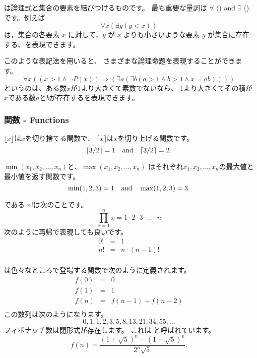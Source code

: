 
は論理式と集合の要素を結びつけるものです。
最も重要な量詞は
$\forall$ () and $\exists$ ().
です。例えば
\[\forall x (\exists y (y < x))\]
は，集合の各要素 $x$ に対して，$y$ が $x$ よりも小さいような要素 $y$ が集合に存在する、を表現できます。

このような表記法を用いると、
さまざまな論理命題を表現することができます。
\[\forall x ((x>1 \land \lnot P(x)) \Rightarrow (\exists a (\exists b (a > 1 \land b > 1 \land x = ab))))\]
というのは、ある数$x$が1より大きくて素数でないなら、
1より大きくてその積が$x$である数$a$と$b$が存在するを表現できます。

\subsubsection{関数 - Functions}

$\lfloor x \rfloor$は$x$を切り捨てる関数で、
$\lceil x \rceil$は$x$を切り上げる関数です。
\[ \lfloor 3/2 \rfloor = 1 \hspace{10px} \textrm{and} \hspace{10px} \lceil 3/2 \rceil = 2.\]

$\min(x_1,x_2,\ldots,x_n)$と、$\max(x_1,x_2,\ldots,x_n)$
はそれぞれ$x_1,x_2,\ldots,x_n$の最大値と最小値を返す関数です。
\[ \min(1,2,3)=1 \hspace{10px} \textrm{and} \hspace{10px} \max(1,2,3)=3.\]


 である $n!$は次のことです。
\[\prod_{x=1}^n x = 1 \cdot 2 \cdot 3 \cdot \ldots \cdot n\]
次のように再帰で表現しても良いです。
\[
\begin{array}{lcl}
0! & = & 1 \\
n! & = & n \cdot (n-1)! \\
\end{array}
\]


は色々なところで登場する関数で次のように定義されます。
\[
\begin{array}{lcl}
f(0) & = & 0 \\
f(1) & = & 1 \\
f(n) & = & f(n-1)+f(n-2) \\
\end{array}
\]
この数列は次のようになります。
\[0, 1, 1, 2, 3, 5, 8, 13, 21, 34, 55, \ldots\]
フィボナッチ数は閉形式が存在します。
これは 
と呼ばれています。
\[f(n)=\frac{(1 + \sqrt{5})^n - (1-\sqrt{5})^n}{2^n \sqrt{5}}.\]

